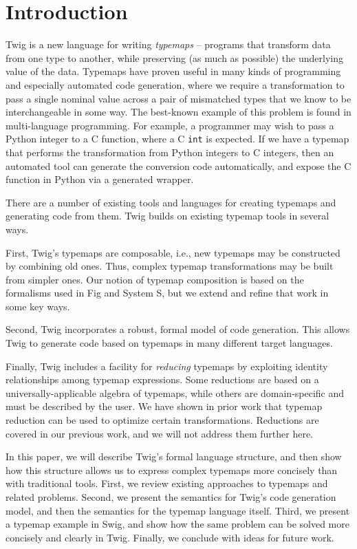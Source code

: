 
\section{Introduction}

Twig is a new language for writing \emph{typemaps} -- programs that transform data from one type to another, while preserving (as much as possible) the underlying value of the data. Typemaps have proven useful in many kinds of programming and especially automated code generation, where we require a transformation to pass a single nominal value across a pair of mismatched types that we know to be interchangeable in some way. The best-known example of this problem is found in multi-language programming. For example, a programmer may wish to pass a Python integer to a C function, where a C \texttt{int} is expected. If we have a typemap that performs the transformation from Python integers to C integers, then an automated tool can generate the conversion code automatically, and expose the C function in Python via a generated wrapper.

There are a number of existing tools and languages for creating typemaps and generating code from them. Twig builds on existing typemap tools in several ways.

First, Twig's typemaps are composable, i.e., new typemaps may be constructed by combining old ones. Thus, complex typemap transformations may be built from simpler ones. Our notion of typemap composition is based on the formalisms used in Fig\cite{fig} and System S\cite{system-s}, but we extend and refine that work in some key ways.

Second, Twig incorporates a robust, formal model of code generation. This allows Twig to generate code based on typemaps in many different target languages.

Finally, Twig includes a facility for \emph{reducing} typemaps by exploiting identity relationships among typemap expressions. Some reductions are based on a universally-applicable algebra of typemaps, while others are domain-specific and must be described by the user. We have shown in prior work that typemap reduction can be used to optimize certain transformations. Reductions are covered in our previous work, and we will not address them further here.

In this paper, we will describe Twig's formal language structure, and then show how this structure allows us to express complex typemaps more concisely than with traditional tools. First, we review existing approaches to typemaps and related problems. Second, we present the semantics for Twig's code generation model, and then the semantics for the typemap language itself. Third, we present a typemap example in Swig, and show how the same problem can be solved more concisely and clearly in Twig. Finally, we conclude with ideas for future work.
